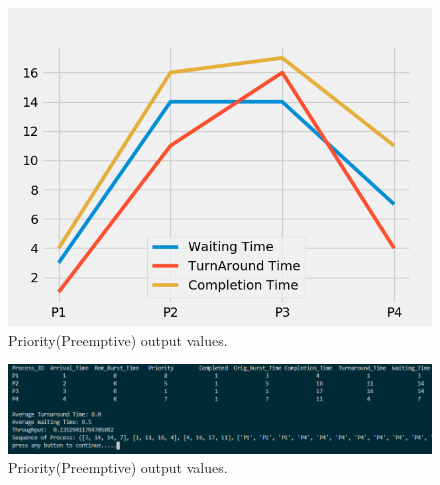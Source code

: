 \documentclass[11pt,a4paper]{report}
\begin{document}
{\begin{figure}[H]
	\centering
	\includegraphics[scale=0.75]{./img/PRIORITY_P_output.png}
	\caption{Priority(Preemptive) output values.}
\end{figure}}

{\begin{figure}[H]
	\centering
	\includegraphics[scale=0.5]{./img/priority_p_out.PNG}
	\caption{Priority(Preemptive) output values.}
\end{figure}}
\end{document}
